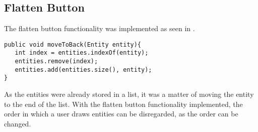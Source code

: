 \subsection{Flatten Button}
The flatten button functionality was implemented as seen in .

\begin{lstlisting}[label={lst:flatten}, caption={Flatten Button functionality}]
public void moveToBack(Entity entity){
   int index = entities.indexOf(entity);
   entities.remove(index);
   entities.add(entities.size(), entity);
}
\end{lstlisting}

As the entities were already stored in a list, it was a matter of moving the entity to the end of the list.
With the flatten button functionality implemented, the order in which a user draws entities can be disregarded, as the order can be changed.